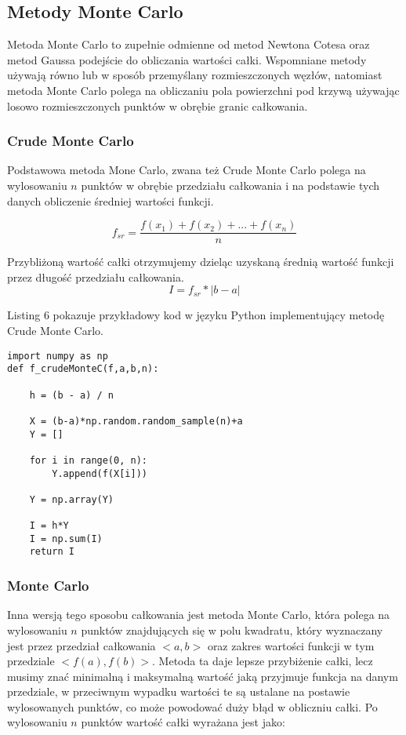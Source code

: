 \documentclass[12pt,twoside]{article}
\begin{document}
\subsection{Metody Monte Carlo}

Metoda Monte Carlo to zupełnie odmienne od metod Newtona Cotesa oraz metod Gaussa podejście do obliczania wartości całki.
Wspomniane metody używają równo lub w sposób przemyślany rozmieszczonych węzłów, natomiast metoda Monte Carlo polega na obliczaniu pola powierzchni pod krzywą używając losowo rozmieszczonych punktów w obrębie granic całkowania.\\

\subsubsection{Crude Monte Carlo}
Podstawowa metoda Mone Carlo, zwana też Crude Monte Carlo polega  na wylosowaniu $n$ punktów w obrębie przedziału całkowania i na podstawie tych danych obliczenie średniej wartości funkcji\cite{MonteCarlo_1}. 

\begin{equation}
f_{sr} = \frac{f(x_1)+f(x_2) + ... + f(x_n)}{n}
\label{Eq:MonteCarlo1}
\end{equation}

Przybliżoną wartość całki otrzymujemy dzieląc uzyskaną średnią wartość funkcji przez długość przedziału całkowania.
\begin{equation}
 I = f_{sr} * |b-a| 
\label{Eq:MonteCarlo2}
\end{equation}

Listing 6 pokazuje przykładowy kod w języku Python implementujący metodę Crude Monte Carlo.

\begin{lstlisting}[caption={Kod w języku python implementujący metodę Crude Monte Carlo}]
	import numpy as np
def f_crudeMonteC(f,a,b,n):

    h = (b - a) / n

    X = (b-a)*np.random.random_sample(n)+a
    Y = []

    for i in range(0, n):
        Y.append(f(X[i]))

    Y = np.array(Y)

    I = h*Y
    I = np.sum(I)
    return I

\end{lstlisting}
\label{Listing 6}

\subsubsection{Monte Carlo}
Inna wersją tego sposobu całkowania jest metoda Monte Carlo, która polega na wylosowaniu $n$ punktów znajdujących się w polu kwadratu, który wyznaczany jest przez przedział całkowania $<a,b>$ oraz zakres wartości funkcji w tym przedziale $<f(a),f(b)>$.
Metoda ta daje lepsze przybiżenie całki, lecz musimy znać minimalną i maksymalną wartość jaką przyjmuje funkcja na danym przedziale, w przeciwnym wypadku wartości te są ustalane na postawie wylosowanych punktów, co może powodować duży błąd w obliczniu całki. Po wylosowaniu $n$ punktów wartość całki wyrażana jest jako:
\end{document}

